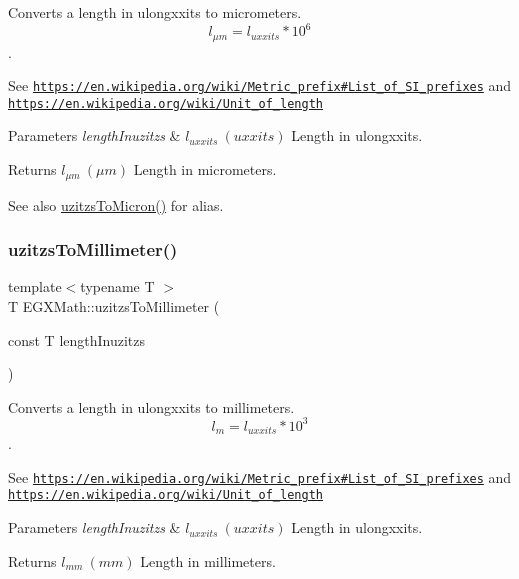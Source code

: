 Converts a length in ulongxxits to micrometers. \[ l_{\mu m}=l_{uxxits} * 10^{6} \]. 

See \href{https://en.wikipedia.org/wiki/Metric_prefix#List_of_SI_prefixes}{\tt https\+://en.\+wikipedia.\+org/wiki/\+Metric\+\_\+prefix\#\+List\+\_\+of\+\_\+\+S\+I\+\_\+prefixes} and \href{https://en.wikipedia.org/wiki/Unit_of_length}{\tt https\+://en.\+wikipedia.\+org/wiki/\+Unit\+\_\+of\+\_\+length} 
\begin{DoxyParams}{Parameters}
{\em length\+Inuzitzs} & $ l_{uxxits}\ (uxxits)$ Length in ulongxxits. \\
\hline
\end{DoxyParams}
\begin{DoxyReturn}{Returns}
$ l_{\mu m}\ (\mu m)$ Length in micrometers. 
\end{DoxyReturn}
\begin{DoxySeeAlso}{See also}
\mbox{\hyperlink{group___e_g_x_math-_conversions-_length_conversions-uzitzs-_non-_s_i_ga695a8fd8870537930d6378e99ad2aa9f}{uzitzs\+To\+Micron()}} for alias. 
\end{DoxySeeAlso}
\mbox{\label{group___e_g_x_math-_conversions-_length_conversions-uzitzs-_s_i_gaf507dd646327861da523586b417d132e}} 
\subsubsection{\texorpdfstring{uzitzs\+To\+Millimeter()}{uzitzsToMillimeter()}}
{\footnotesize\ttfamily template$<$typename T $>$ \\
T E\+G\+X\+Math\+::uzitzs\+To\+Millimeter (\begin{DoxyParamCaption}\item[{const T}]{length\+Inuzitzs }\end{DoxyParamCaption})}



Converts a length in ulongxxits to millimeters. \[ l_{m}=l_{uxxits} * 10^{3} \]. 

See \href{https://en.wikipedia.org/wiki/Metric_prefix#List_of_SI_prefixes}{\tt https\+://en.\+wikipedia.\+org/wiki/\+Metric\+\_\+prefix\#\+List\+\_\+of\+\_\+\+S\+I\+\_\+prefixes} and \href{https://en.wikipedia.org/wiki/Unit_of_length}{\tt https\+://en.\+wikipedia.\+org/wiki/\+Unit\+\_\+of\+\_\+length} 
\begin{DoxyParams}{Parameters}
{\em length\+Inuzitzs} & $ l_{uxxits}\ (uxxits)$ Length in ulongxxits. \\
\hline
\end{DoxyParams}
\begin{DoxyReturn}{Returns}
$ l_{mm}\ (mm)$ Length in millimeters. 
\end{DoxyReturn}
\mbox{\label{group___e_g_x_math-_conversions-_length_conversions-uzitzs-_s_i_ga6c21ffa2ef282d817d349c249eaaa21f}} 
